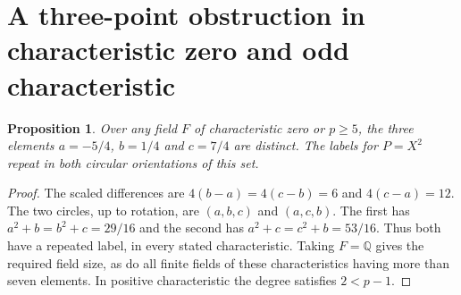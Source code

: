 \documentclass[10pt]{article}
\newtheorem{proposition}[theorem]{Proposition}
\begin{document}
\section{A three-point obstruction in characteristic zero and odd characteristic}
\begin{proposition}
Over any field $F$ of characteristic zero or $p\ge5$, the three elements $a=-5/4$, $b=1/4$ and $c=7/4$ are distinct. The labels for $P=X^2$ repeat in both circular orientations of this set.
\end{proposition}
\begin{proof}
The scaled differences are $4(b-a)=4(c-b)=6$ and $4(c-a)=12$. The two circles, up to rotation, are $(a,b,c)$ and $(a,c,b)$. The first has $a^2+b=b^2+c=29/16$ and the second has $a^2+c=c^2+b=53/16$. Thus both have a repeated label, in every stated characteristic. Taking $F=\mathbb Q$ gives the required field size, as do all finite fields of these characteristics having more than seven elements. In positive characteristic the degree satisfies $2<p-1$.
\end{proof}
\end{document}
